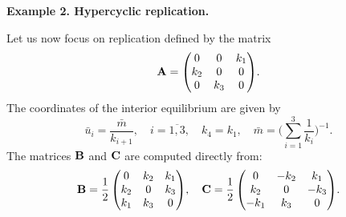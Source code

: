 \documentclass[12pt]{report}
\theoremstyle{definition}
\theoremstyle{remark}
\begin{document}
\medskip
\textbf{Example 2. Hypercyclic replication.}

Let us now focus on replication defined by the matrix
$$
{\bf A} = 
\begin{pmatrix}
	0 & 0 & k_{1}\\
	k_{2} & 0 & 0\\
	0 & k_{3} & 0\\
\end{pmatrix}\!.
$$
The coordinates of the interior equilibrium are given by
$$
\bar{u}_{i} = \frac{\bar{m}}{k_{i + 1}}, \quad i = \overline{1, 3}, \quad k_{4} = k_{1}, \quad \bar{m} = \Bigg(\sum\limits_{i = 1}^{3}\frac{1}{k_{i}}\Bigg)^{-1}\!\!.
$$
The matrices ${\bf B}$ and ${\bf C}$ are computed directly from:
$$
{\bf B} = \frac{1}{2} 
\begin{pmatrix}
	0 & k_{2} & k_{1}\\
	k_{2} & 0 & k_{3}\\
	k_{1} & k_{3} & 0\\
\end{pmatrix}\!, \quad 
{\bf C} = \frac{1}{2} 
\begin{pmatrix}
	0 & -k_{2} & k_{1}\\
	k_{2} & 0 & -k_{3}\\
	-k_{1} & k_{3} & 0\\
\end{pmatrix}\!.
$$
\end{document}
